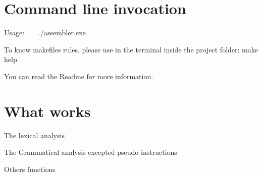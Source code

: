 \hypertarget{index_sec0}{}\section{Command line invocation}\label{index_sec0}
Usage\+: ~\newline
 ~\newline
 ./assembler.exe

To know makefile\textquotesingle{}s rules, please use in the terminal inside the project folder\+: make help

You can read the Readme for more information.\hypertarget{index_sec1}{}\section{What works}\label{index_sec1}

\begin{DoxyItemize}
\item The lexical analysis ~\newline

\item The Grammatical analysis excepted pseudo-\/instructions ~\newline

\item Others functions ~\newline
 
\end{DoxyItemize}